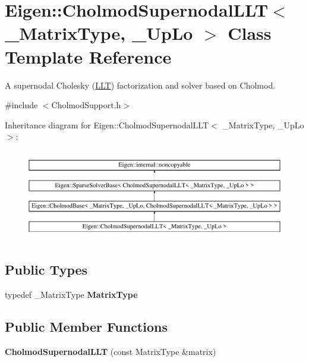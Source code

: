 \hypertarget{class_eigen_1_1_cholmod_supernodal_l_l_t}{}\section{Eigen\+::Cholmod\+Supernodal\+L\+LT$<$ \+\_\+\+Matrix\+Type, \+\_\+\+Up\+Lo $>$ Class Template Reference}
\label{class_eigen_1_1_cholmod_supernodal_l_l_t}


A supernodal Cholesky (\mbox{\hyperlink{class_eigen_1_1_l_l_t}{L\+LT}}) factorization and solver based on Cholmod.  




{\ttfamily \#include $<$Cholmod\+Support.\+h$>$}

Inheritance diagram for Eigen\+::Cholmod\+Supernodal\+L\+LT$<$ \+\_\+\+Matrix\+Type, \+\_\+\+Up\+Lo $>$\+:\begin{figure}[H]
\begin{center}
\leavevmode
\includegraphics[height=4.000000cm]{class_eigen_1_1_cholmod_supernodal_l_l_t}
\end{center}
\end{figure}
\subsection*{Public Types}
\begin{DoxyCompactItemize}
\item 
\mbox{\label{class_eigen_1_1_cholmod_supernodal_l_l_t_a65e46c3ca6023d947706dac78173e916}} 
typedef \+\_\+\+Matrix\+Type {\bfseries Matrix\+Type}
\end{DoxyCompactItemize}
\subsection*{Public Member Functions}
\begin{DoxyCompactItemize}
\item 
\mbox{\label{class_eigen_1_1_cholmod_supernodal_l_l_t_acd892066850e8ee5fbdc33d40f006cb3}} 
{\bfseries Cholmod\+Supernodal\+L\+LT} (const Matrix\+Type \&matrix)
\end{DoxyCompactItemize}
